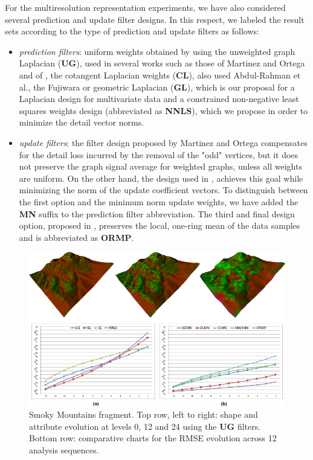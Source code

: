 \documentclass[graybox]{svmult}
\begin{document}
	
	For the multiresolution representation experiments, we have also considered several prediction and update filter designs. In this respect, we labeled the result sets according to the type of prediction and update filters as follows:
	\begin{itemize}
		\item{\emph{prediction filters}}: uniform weights obtained by using the unweighted graph Laplacian (\textbf{UG}), used in several works such as those of Martinez and Ortega \cite{Martinez2011} and of \cite{AbdulRahman2013}, the cotangent Laplacian weights (\textbf{CL}), also used Abdul-Rahman et al., the Fujiwara or geometric Laplacian (\textbf{GL}), which is our proposal for a Laplacian design for multivariate data and a constrained  non-negative least squares weights design (abbreviated as \textbf{NNLS}), which we propose in order to minimize the detail vector norms.
		\item{\emph{update filters}}: the filter design proposed by Martinez and Ortega \cite{Martinez2011} compensates for the detail loss incurred by the removal of the "odd" vertices, but it does not preserve the graph signal average for weighted graphs, unless all weights are uniform. On the other hand, the design used in \cite{Jansen2001,Wagner2005}, achieves this goal while minimizing the norm of the update coefficient vectors. To distinguish between the first option and the minimum norm update weights, we have added the \textbf{MN} suffix to the prediction filter abbreviation. The third and final design option, proposed in \cite{AbdulRahman2013}, preserves the local, one-ring mean of the data samples  and is abbreviated as \textbf{ORMP}.
	\end{itemize}
	
	\begin{figure}[!htbp]
		\centering
		\includegraphics{smokey_lod_rmse.pdf}
		
		\caption{\label{fig_cds:smokey_lod_rmse}%
			Smoky Mountains fragment. Top row, left to right: shape and attribute evolution at levels 0, 12 and 24 using the \textbf{UG} filters. Bottom row: comparative charts for the RMSE evolution across 12 analysis sequences. }
	\end{figure}
	
\end{document}
